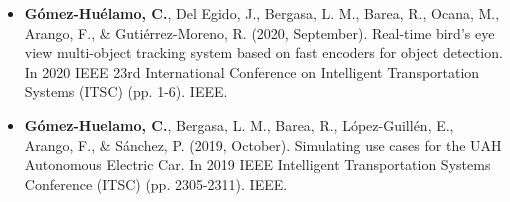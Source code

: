 \begin{refsection}
\begin{itemize}
\item \textbf{Gómez-Huélamo, C.}, Del Egido, J., Bergasa, L. M., Barea, R., Ocana, M., Arango, F., \& Gutiérrez-Moreno, R. (2020, September). Real-time bird’s eye view multi-object tracking system based on fast encoders for object detection. In 2020 IEEE 23rd International Conference on Intelligent Transportation Systems (ITSC) (pp. 1-6). IEEE.

\item \textbf{Gómez-Huelamo, C.}, Bergasa, L. M., Barea, R., López-Guillén, E., Arango, F., \& Sánchez, P. (2019, October). Simulating use cases for the UAH Autonomous Electric Car. In 2019 IEEE Intelligent Transportation Systems Conference (ITSC) (pp. 2305-2311). IEEE.

\end{itemize}

\end{refsection}



